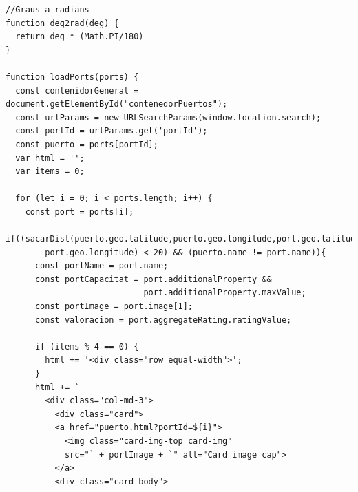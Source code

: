 \documentclass{article}
\begin{document}
\begin{itemize}
\begin{verbatim}
//Graus a radians
function deg2rad(deg) {
  return deg * (Math.PI/180)
}

function loadPorts(ports) {
  const contenidorGeneral = document.getElementById("contenedorPuertos");
  const urlParams = new URLSearchParams(window.location.search);
  const portId = urlParams.get('portId');
  const puerto = ports[portId];
  var html = '';
  var items = 0;

  for (let i = 0; i < ports.length; i++) {
    const port = ports[i];
    if((sacarDist(puerto.geo.latitude,puerto.geo.longitude,port.geo.latitude,
        port.geo.longitude) < 20) && (puerto.name != port.name)){
      const portName = port.name;
      const portCapacitat = port.additionalProperty && 
                            port.additionalProperty.maxValue;
      const portImage = port.image[1];
      const valoracion = port.aggregateRating.ratingValue;

      if (items % 4 == 0) {
        html += '<div class="row equal-width">';
      }
      html += `
        <div class="col-md-3">
          <div class="card">
          <a href="puerto.html?portId=${i}">
            <img class="card-img-top card-img" 
            src="` + portImage + `" alt="Card image cap">
          </a>
          <div class="card-body"> 
           

\end{verbatim}
\end{itemize}
\end{document}
